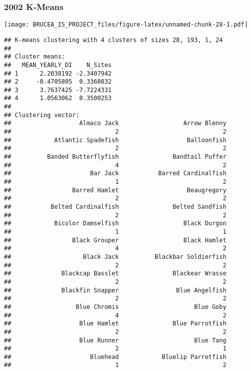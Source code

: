 \documentclass[
]{article}
\begin{document}
\hypertarget{k-means-2}{%
\subsubsection{2002 K-Means}\label{k-means-2}}

\texttt{[image: BRUCEA\_IS\_PROJECT\_files/figure-latex/unnamed-chunk-28-1.pdf]}

\begin{verbatim}
## K-means clustering with 4 clusters of sizes 28, 193, 1, 24
## 
## Cluster means:
##   MEAN_YEARLY_DI    N_Sites
## 1      2.2038192 -2.3407942
## 2     -0.4705805  0.3360832
## 3      3.7637425 -7.7224331
## 4      1.0563062  0.3500253
## 
## Clustering vector:
##                   Almaco Jack                  Arrow Blenny 
##                             2                             2 
##            Atlantic Spadefish                   Balloonfish 
##                             2                             2 
##          Banded Butterflyfish               Bandtail Puffer 
##                             4                             2 
##                      Bar Jack           Barred Cardinalfish 
##                             1                             2 
##                 Barred Hamlet                   Beaugregory 
##                             2                             2 
##           Belted Cardinalfish               Belted Sandfish 
##                             2                             2 
##            Bicolor Damselfish                  Black Durgon 
##                             1                             1 
##                 Black Grouper                  Black Hamlet 
##                             4                             2 
##                    Black Jack          Blackbar Soldierfish 
##                             2                             2 
##              Blackcap Basslet               Blackear Wrasse 
##                             2                             2 
##              Blackfin Snapper                Blue Angelfish 
##                             2                             2 
##                  Blue Chromis                     Blue Goby 
##                             4                             2 
##                   Blue Hamlet               Blue Parrotfish 
##                             2                             2 
##                   Blue Runner                     Blue Tang 
##                             2                             1 
##                      Bluehead            Bluelip Parrotfish 
##                             1                             2 

\end{verbatim}
\end{document}
